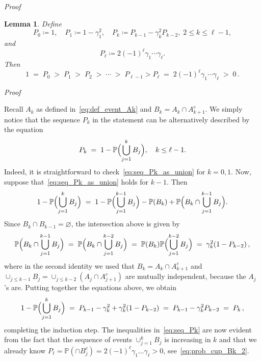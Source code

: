 \documentclass[reqno,a4paper,11pt]{amsart}
\makeatletter
\newtheorem{lemma}{Lemma}
\theoremstyle{remark}
\newcommand{\bb}[1]{{\mathbb #1}}
\numberwithin{equation}{section}
\renewenvironment{proof}[1][Proof]{\par
\pushQED{\qed}%
\normalfont \topsep6\p@\@plus6\p@\relax
\trivlist
\item\relax
{\itshape
#1\@addpunct{.}}\hspace\labelsep\ignorespaces
}{%
\popQED\endtrivlist\@endpefalse
}
\makeatother
\begin{document}
\begin{proof}
\begin{lemma}
\label{lema:seq_Pk}
Define 
$$P_0 \coloneqq 1,\quad  P_1\coloneqq 1 - \gamma^2_1,\quad  P_k \coloneqq P_{k-1} - \gamma_k^2
P_{k-2}, \; 2\leq k\leq \ell-1,$$
%
and
%
$$P_\ell\coloneqq 2(-1)^\ell \gamma_1\cdots \gamma_\ell.
$$ 
%
Then
\begin{equation}
\label{eq:seq_Pk}
1    \;=\; P_0 \;>\; P_1 \;>\; P_2 \;>\; \cdots \;>\; P_{\ell-1} > P_{\ell}
    \;=\; 2(-1)^{\ell} \gamma_1 \cdots \gamma_\ell
    \;>\;0\,.
\end{equation}
\end{lemma}

\begin{proof}
Recall $A_k$ as defined in~\eqref{eq:def_event_Ak} and $B_k = A_k \cap
A_{k+1}^c$. We simply notice that the sequence $P_k$ in the statement can be
alternatively described by the equation
\begin{equation}\label{eq:seq_Pk_as_union}
    P_k \;=\; 1 - \bb P \Bigl(\bigcup_{j=1}^k B_j\Bigr),\quad k\leq \ell-1.
\end{equation}
Indeed, it is straightforward to check~\eqref{eq:seq_Pk_as_union} for $k=0,1$.
Now, suppose that~\eqref{eq:seq_Pk_as_union} holds for $k-1$. Then
\begin{align*}
1 - \bb P\Bigl( \bigcup_{j=1}^k B_j\Bigr)
    \;=\; 1 - \bb P\Bigl( \bigcup_{j=1}^{k-1} B_j\Bigr) - \bb P (B_k)
    + \bb P\Bigl( B_k \cap \bigcup_{j=1}^{k-1} B_j\Bigr).
\end{align*}
Since $B_k \cap B_{k-1} = \varnothing$, the intersection above is given by
\begin{equation*}
\bb P\Bigl( B_k \cap \bigcup_{j=1}^{k-1} B_j\Bigr)
\;=\; \bb P\Bigl( B_k \cap \bigcup_{j=1}^{k-2} B_j\Bigr)
    \;=\; \bb P(B_k) \bb P\Bigl(\bigcup_{j=1}^{k-2} B_j\Bigr)
    \;=\; \gamma_k^2 (1 - P_{k-2})\,,
\end{equation*}
%
where in the second identity we used that $B_k=A_k\cap A_{k+1}^c$ and $\cup_{j\leq k-1} B_j=\cup_{j\leq k-2}(A_j\cap A_{j+1}^c)$ are mutually independent, because the $A_j$'s are.
Putting together the equations above, we obtain
\begin{equation*}
1 - \bb P\Bigl( \bigcup_{j=1}^kB_j\Bigr)
    \;=\; P_{k-1} - \gamma_k^2 + \gamma_k^2 (1-P_{k-2})
    \;=\; P_{k-1} - \gamma_k^2 P_{k-2}
    \;=\; P_k\,,
\end{equation*}
completing the induction step.
The inequalities in~\eqref{eq:seq_Pk} are now evident from the fact that
the sequence of events $\cup_{j=1}^k B_j$ is increasing in $k$ and that
we already know $P_{\ell} = \bb P(\cap B_j^c) = 2 (-1)^{\ell} \gamma_1 \dots
    \gamma_{\ell} > 0$, see~\eqref{eq:prob_cup_Bk_2}.
\end{proof}


\end{proof}
\end{document}
